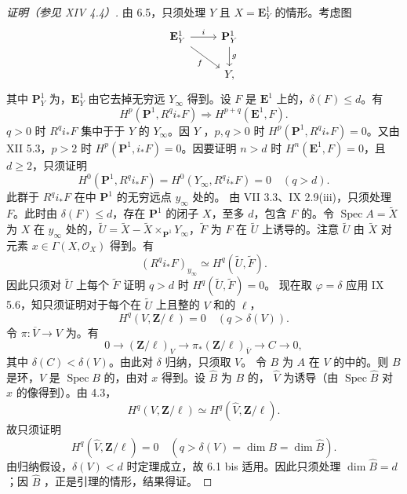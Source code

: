 \begin{proof}[证明（参见 XIV 4.4）]
由 6.5，只须处理 $Y$ 且 $X=\mathbf E_Y^1$ 的情形。考虑图
\[\begin{tikzcd}\mathbf E_Y^1\arrow[r,"i"]\arrow[dr,"f"']&\mathbf P_Y^1\arrow[d,"g"]\\&Y,\end{tikzcd}\]
其中 $\mathbf P_Y^1$ 为，$\mathbf E_Y^1$ 由它去掉无穷远 $Y_\infty$ 得到。设 $F$ 是 $\mathbf E^1$ 上的，$\delta(F)\le d$。有
\[H^p(\mathbf P^1,R^qi_*F)\Longrightarrow H^{p+q}(\mathbf E^1,F).\]
$q>0$ 时 $R^qi_*F$ 集中于于 $Y$ 的 $Y_\infty$。因 $Y$ ，$p,q>0$ 时 $H^p(\mathbf P^1,R^qi_*F)=0$。又由 XII 5.3，$p>2$ 时 $H^p(\mathbf P^1,i_*F)=0$。因要证明 $n>d$ 时 $H^n(\mathbf E^1,F)=0$，且 $d\ge2$，只须证明
\[H^0(\mathbf P^1,R^qi_*F)=H^0(Y_\infty,R^qi_*F)=0\quad(q>d).\]
此群于 $R^qi_*F$ 在中 $\mathbf P^1$ 的无穷远点 $y_\infty$ 处的。
由 VII 3.3、IX 2.9(iii)，只须处理 $F$。此时由 $\delta(F)\le d$，存在 $\mathbf P^1$ 的闭子 $X$，至多 $d$，包含 $F$ 的。令 $\operatorname{Spec}A=\widetilde X$ 为 $X$ 在 $y_\infty$ 处的，$\widetilde U=\widetilde X-\widetilde X\times_{\mathbf P^1}Y_\infty$，$\widetilde F$ 为 $F$ 在 $\widetilde U$ 上诱导的。注意 $\widetilde U$ 由 $\widetilde X$ 对元素 $x\in\Gamma(X,\mathcal O_X)$ 得到。有
\[(R^qi_*F)_{y_\infty}\simeq H^q(\widetilde U,\widetilde F).\]
因此只须对 $\widetilde U$ 上每个 $\widetilde F$ 证明 $q>d$ 时 $H^q(\widetilde U,\widetilde F)=0$。
现在取 $\varphi=\delta$ 应用 IX 5.6，知只须证明对于每个在 $\widetilde U$ 上且整的 $V$ 和的 $\ell$，
\[H^q(V,\mathbf Z/\ell)=0\quad(q>\delta(V)).\]
令 $\pi:\overline V\to V$ 为。有
\[0\longrightarrow(\mathbf Z/\ell)_V\longrightarrow\pi_*(\mathbf Z/\ell)_{\overline V}\longrightarrow C\longrightarrow0,\]
其中 $\delta(C)<\delta(V)$。由此对 $\delta$ 归纳，只须取 $V$。
令 $B$ 为 $A$ 在 $V$ 的中的。则 $B$ 是环，$V$ 是 $\operatorname{Spec}B$ 的，由对 $x$ 得到。设 $\widehat B$ 为 $B$ 的，
$\widehat V$ 为诱导（由 $\operatorname{Spec}\widehat B$ 对 $x$ 的像得到）。由 4.3，
\[H^q(V,\mathbf Z/\ell)\simeq H^q(\widehat V,\mathbf Z/\ell).\]
故只须证明
\[H^q(\widehat V,\mathbf Z/\ell)=0\quad(q>\delta(V)=\dim B=\dim\widehat B).\]
由归纳假设，$\delta(V)<d$ 时定理成立，故 6.1 bis 适用。因此只须处理 $\dim\widehat B=d$；因 $\widehat B$ ，正是引理的情形，结果得证。
\end{proof}
